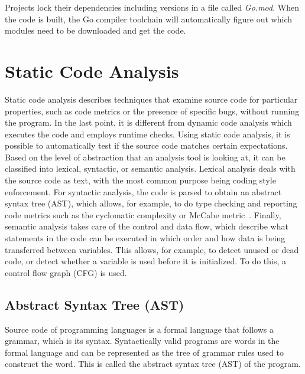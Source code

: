 

Projects lock their dependencies including versions in a file called \textit{Go.mod}.
When the code is built, the Go compiler toolchain will automatically figure out which modules need to be downloaded and
get the code.



\section{Static Code Analysis}\label{sec:background:static-code-analysis}

Static code analysis describes techniques that examine source code for particular properties, such as code metrics or
the presence of specific bugs, without running the program.
In the last point, it is different from dynamic code analysis which executes the code and employs runtime checks.
Using static code analysis, it is possible to automatically test if the source code matches certain expectations.
Based on the level of abstraction that an analysis tool is looking at, it can be classified into lexical, syntactic,
or semantic analysis.
Lexical analysis deals with the source code as text, with the most common purpose being coding style enforcement.
For syntactic analysis, the code is parsed to obtain an abstract syntax tree (\acrshort{AST}), which allows, for
example, to do type checking and reporting code metrics such as the cyclomatic complexity or McCabe
metric~\cite{watson1996}.
Finally, semantic analysis takes care of the control and data flow, which describe what statements in the code can
be executed in which order and how data is being transferred between variables.
This allows, for example, to detect unused or dead code, or detect whether a variable is used before it is initialized.
To do this, a control flow graph (\acrshort{CFG}) is used.



\subsection{Abstract Syntax Tree (AST)}\label{subsec:background:static-code-analysis:ast}

Source code of programming languages is a formal language that follows a grammar, which is its syntax.
Syntactically valid programs are words in the formal language and can be represented as the tree of grammar rules used
to construct the word.
This is called the abstract syntax tree (\acrshort{AST}) of the program.

